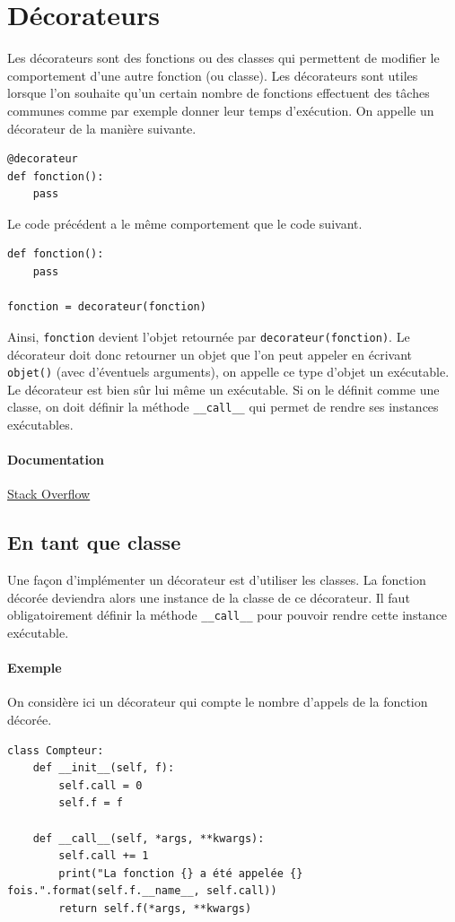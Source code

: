 \documentclass[a4paper, 10pt]{article}
\begin{document}
\section{Décorateurs}
Les décorateurs sont des fonctions ou des classes qui permettent de modifier le comportement d'une autre fonction (ou classe). Les décorateurs sont utiles lorsque l'on souhaite qu'un certain nombre de fonctions effectuent des tâches communes comme par exemple donner leur temps d'exécution. On appelle un décorateur de la manière suivante.

\begin{verbatim}
@decorateur
def fonction():
    pass
\end{verbatim}

Le code précédent a le même comportement que le code suivant.

\begin{verbatim}
def fonction():
    pass

fonction = decorateur(fonction)
\end{verbatim}

Ainsi, \texttt{fonction} devient l'objet retournée par \texttt{decorateur(fonction)}. Le décorateur doit donc retourner un objet que l'on peut appeler en écrivant \texttt{objet()} (avec d'éventuels arguments), on appelle ce type d'objet un \og exécutable\fg{}. Le décorateur est bien sûr lui même un exécutable. Si on le définit comme une classe, on doit définir la méthode \texttt{__call__} qui permet de rendre ses instances exécutables.

\paragraph{Documentation} \href{https://stackoverflow.com/questions/739654/how-to-make-a-chain-of-function-decorators/1594484#1594484}{Stack Overflow}

\subsection{En tant que classe}
Une façon d'implémenter un décorateur est d'utiliser les classes. La fonction décorée deviendra alors une instance de la classe de ce décorateur. Il faut obligatoirement définir la méthode \texttt{__call__} pour pouvoir rendre cette instance exécutable.

\paragraph{Exemple} On considère ici un décorateur qui compte le nombre d'appels de la fonction décorée.
\begin{verbatim}
class Compteur:
    def __init__(self, f):
        self.call = 0
        self.f = f

    def __call__(self, *args, **kwargs):
        self.call += 1
        print("La fonction {} a été appelée {} fois.".format(self.f.__name__, self.call))
        return self.f(*args, **kwargs)
\end{verbatim}
\end{document}
